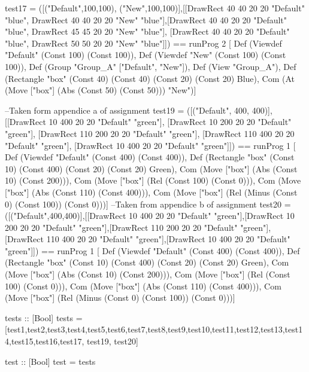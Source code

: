 \documentclass[11pt]{article}
\renewenvironment{verbatim}{}{}
\begin{document}
\begin{verbatim}
test17 = ([("Default",100,100), ("New",100,100)],[[DrawRect 40 40 20 20 "Default" "blue", DrawRect 40 40 20 20 "New" "blue"],[DrawRect 40 40 20 20 "Default" "blue", DrawRect 45 45 20 20 "New" "blue"], [DrawRect 40 40 20 20 "Default" "blue", DrawRect 50 50 20 20 "New" "blue"]]) 
     ==  runProg 2
    [ Def (Viewdef "Default" (Const 100) (Const 100)), Def (Viewdef "New" (Const 100) (Const 100)), Def (Group "Group_A" ["Default", "New"]), Def (View "Group_A"), Def (Rectangle "box" (Const 40) (Const 40) (Const 20) (Const 20) Blue), Com (At (Move ["box"] (Abs (Const 50) (Const 50))) "New")]


--Taken form appendice a of assignment
test19 = ([("Default", 400, 400)], [[DrawRect 10 400 20 20 "Default" "green"], [DrawRect 10 200 20 20 "Default" "green"], [DrawRect 110 200 20 20 "Default" "green"], [DrawRect 110 400 20 20 "Default" "green"], [DrawRect 10 400 20 20 "Default" "green"]])
     ==  runProg 1
    [ Def (Viewdef "Default" (Const 400) (Const 400)), Def (Rectangle "box" (Const 10) (Const 400) (Const 20) (Const 20) Green), Com (Move ["box"] (Abs (Const 10) (Const 200))), Com (Move ["box"] (Rel (Const 100) (Const 0))), Com (Move ["box"] (Abs (Const 110) (Const 400))), Com (Move ["box"] (Rel (Minus (Const 0) (Const 100)) (Const 0)))]
--Taken from appendice b of assignment
test20 = ([("Default",400,400)],[[DrawRect 10 400 20 20 "Default" "green"],[DrawRect 10 200 20 20 "Default" "green"],[DrawRect 110 200 20 20 "Default" "green"],[DrawRect 110 400 20 20 "Default" "green"],[DrawRect 10 400 20 20 "Default" "green"]])
     ==  runProg 1
    [ Def (Viewdef "Default" (Const 400) (Const 400)), Def (Rectangle "box" (Const 10) (Const 400) (Const 20) (Const 20) Green), Com (Move ["box"] (Abs (Const 10) (Const 200))), Com (Move ["box"] (Rel (Const 100) (Const 0))), Com (Move ["box"] (Abs (Const 110) (Const 400))), Com (Move ["box"] (Rel (Minus (Const 0) (Const 100)) (Const 0)))]


tests :: [Bool]
tests = [test1,test2,test3,test4,test5,test6,test7,test8,test9,test10,test11,test12,test13,test14,test15,test16,test17, test19, test20]

test :: [Bool]
test = tests
\end{verbatim}
\end{verbatim}

\newpage
\end{document}
